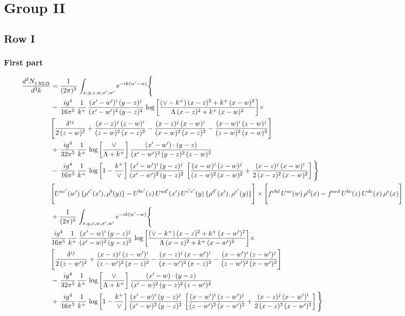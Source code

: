 \documentclass[9pt]{article}
\numberwithin{equation}{section}
\begin{document}
\section{Group II}
\subsection{Row I}
\subsubsection{First part}
\begin{align}
 \frac{d^{3}N_{1\,\rm NLO}^{\rm}}{d^{3}k}  & =    \frac{1}{(2\pi)^{3}}\,\int_{x,y,z,w,x',w^{\prime}} e^{-ik(w^{\prime}-w)}\Bigg\{ \notag \\ & -\, \frac{ig^{4}}{16\pi^{5}}\,\frac{1}{k^{+}}\, \frac{(x'-w')^{i}\,(y-z)^{j}}{(x'-w')^{2}\,(y-z)^{2}}\,\log{\left[\frac{(\vee-k^{+})\,(x-z)^{2}+k^{+}\,(x-w)^{2}}{\Lambda\, (x-z)^{2}+k^{+}\,(x-w)^{2}}\right]}\times\notag \\ &  \Bigg[\frac{\delta^{ij}}{2\,(z-w)^{2}}+\frac{(x-z)^{j}\,(z-w)^{i}}{(z-w)^{2}\,(x-z)^{2}}-\frac{(x-z)^{j}\,(x-w)^{i}}{(x-w)^{2}\,(x-z)^{2}}-\frac{(x-w)^{i}\,(z-w)^{j}}{(z-w)^{2}\,(x-w)^{2}}\Bigg]\notag \\ & +\,\frac{ig^{4}}{32\pi^{5}}\,\frac{1}{k^{+}}\,\log{\left[\frac{\vee}{\Lambda + k^{+}}\right]}\, \frac{(x'-w')\cdot (y-z)}{(x'-w')^{2}\,(y-z)^{2}\,(z-w)^{2}}\notag \\ & -\, \frac{ig^{4}}{16\pi^{5}}\,\frac{1}{k^{+}}\, \log{\left[1-\frac{k^{+}}{\vee}\right]}\,\frac{(x'-w')^{i}\,(y-z)^{j}}{(x'-w')^{2}\,(y-z)^{2}}\,\left[\frac{(x-w)^{i}\,(z-w)^{j}}{(z-w)^{2}\,(x-w)^{2}}+\frac{(x-z)^{j}\,(x-w)^{i}}{2\,(x-z)^{2}\, (x-w)^{2}}\right]\Bigg\} \notag \\ & \Bigg[U^{ac'}(w')\,\{\rho^{c'}(x'),\rho^{b}(y)\}-U^{bc'}(z)\,U^{ad'}(x')\,U^{c'e'}(y)\, \{\rho^{d'}(x'),\rho^{e'}(y)\}\Bigg]\times \Bigg[f^{cbd}\,U^{ac}(w)\,\rho^{d}(x)-f^{acd}\, U^{bc}(z)\,U^{de}(x)\,\rho^{e}(x)\Bigg]\notag \\ & + \frac{1}{(2\pi)^{3}}\,\int_{x,y,z,w,x',w^{\prime}} e^{-ik(w^{\prime}-w)}\Bigg\{ \notag \\ &  \frac{ig^{4}}{16\pi^{5}}\,\frac{1}{k^{+}}\, \frac{(x'-w)^{i}\,(y-z)^{j}}{(x'-w)^{2}\,(y-z)^{2}}\,\log{\left[\frac{(\vee-k^{+})\,(x-z)^{2}+k^{+}\,(x-w')^{2}}{\Lambda\, (x-z)^{2} + k^{+}\,(x-w')^{2}}\right]}\times\notag \\ &  \Bigg[\frac{\delta^{ij}}{2\,(z-w')^{2}}+\frac{(x-z)^{j}\,(z-w')^{i}}{(z-w')^{2}\,(x-z)^{2}}-\frac{(x-z)^{j}\,(x-w')^{i}}{(x-w')^{2}\,(x-z)^{2}}-\frac{(x-w')^{i}\,(z-w')^{j}}{(z-w')^{2}\,(x-w')^{2}}\Bigg]\notag \\ & -\,\frac{ig^{4}}{32\pi^{5}}\,\frac{1}{k^{+}}\,\log{\left[\frac{\vee}{\Lambda + k^{+}}\right]}\, \frac{(x'-w)\cdot (y-z)}{(x'-w)^{2}\,(y-z)^{2}\,(z-w')^{2}}\notag \\ & +\,\frac{ig^{4}}{16\pi^{5}}\,\frac{1}{k^{+}}\, \log{\left[1-\frac{k^{+}}{\vee}\right]}\,\frac{(x'-w)^{i}\,(y-z)^{j}}{(x'-w)^{2}\,(y-z)^{2}}\,\left[\frac{(x-w')^{i}\,(z-w')^{j}}{(z-w')^{2}\,(x-w')^{2}}+\frac{(x-z)^{j}\,(x-w')^{i}}{2\,(x-z)^{2}\, (x-w')^{2}}\right] \Bigg\} \notag \\ & 
\end{align}
\end{document}
